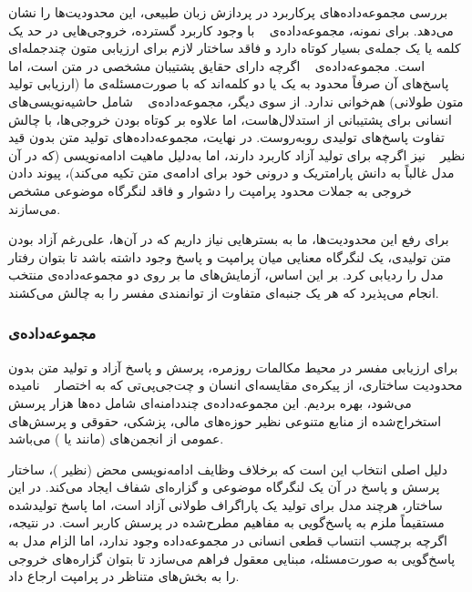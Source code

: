 بررسی مجموعه‌داده‌های پرکاربرد در پردازش زبان طبیعی، این محدودیت‌ها را نشان می‌دهد. برای نمونه، مجموعه‌داده‌ی \href{https://huggingface.co/datasets/stanfordnlp/coqa/}{}~\cite{reddy2019coqa} با وجود کاربرد گسترده، خروجی‌هایی در حد یک کلمه یا یک جمله‌ی بسیار کوتاه دارد و فاقد ساختار لازم برای ارزیابی متون چندجمله‌ای است. مجموعه‌داده‌ی \href{https://huggingface.co/datasets/hotpotqa/hotpot_qa}{}~\cite{yang2018hotpotqa} اگرچه دارای حقایق پشتیبان مشخصی در متن است، اما پاسخ‌های آن صرفاً محدود به یک یا دو کلمه‌اند که با صورت‌مسئله‌ی ما (ارزیابی تولید متون طولانی) هم‌خوانی ندارد. از سوی دیگر، مجموعه‌داده‌ی \href{https://huggingface.co/datasets/StonyBrookNLP/tellmewhy}{}~\cite{lal2021tellmewhy} شامل حاشیه‌نویسی‌های انسانی برای پشتیبانی از استدلال‌هاست، اما علاوه بر کوتاه بودن خروجی‌ها، با چالش تفاوت پاسخ‌های تولیدی روبه‌روست. در نهایت، مجموعه‌داده‌های تولید متن بدون قید نظیر \href{https://huggingface.co/datasets/Salesforce/wikitext}{}~\cite{merity2017pointer} نیز اگرچه برای تولید آزاد کاربرد دارند، اما به‌دلیل ماهیت ادامه‌نویسی (که در آن مدل غالباً به دانش پارامتریک و درونی خود برای ادامه‌ی متن تکیه می‌کند)، پیوند دادن خروجی به جملات محدود پرامپت را دشوار و فاقد لنگرگاه موضوعی مشخص می‌سازند.

برای رفع این محدودیت‌ها، ما به بسترهایی نیاز داریم که در آن‌ها، علی‌رغم آزاد بودن متن تولیدی، یک لنگرگاه معنایی میان پرامپت و پاسخ وجود داشته باشد تا بتوان رفتار مدل را ردیابی کرد. بر این اساس، آزمایش‌های ما بر روی دو مجموعه‌داده‌ی منتخب انجام می‌پذیرد که هر یک جنبه‌ای متفاوت از توانمندی مفسر را به چالش می‌کشند.

\subsubsection{مجموعه‌داده‌ی }\label{sec:5-1-2-1}

برای ارزیابی مفسر در محیط مکالمات روزمره، پرسش و پاسخ آزاد و تولید متن بدون محدودیت ساختاری، از پیکره‌ی مقایسه‌ای انسان و چت‌جی‌پی‌تی که به اختصار \href{https://huggingface.co/datasets/Hello-SimpleAI/HC3/}{}~\cite{guo2023closechatgpthumanexperts} نامیده می‌شود، بهره بردیم. این مجموعه‌داده‌ی چنددامنه‌ای شامل ده‌ها هزار پرسش استخراج‌شده از منابع متنوعی نظیر حوزه‌های مالی، پزشکی، حقوقی و پرسش‌های عمومی از انجمن‌های  (مانند  یا ) می‌باشد. 

دلیل اصلی انتخاب  این است که برخلاف وظایف ادامه‌نویسی محض (نظیر )، ساختار پرسش و پاسخ در آن یک لنگرگاه موضوعی و گزاره‌ای شفاف ایجاد می‌کند. در این ساختار، هرچند مدل برای تولید یک پاراگراف طولانی آزاد است، اما پاسخ تولیدشده مستقیماً ملزم به پاسخ‌گویی به مفاهیم مطرح‌شده در پرسش کاربر است. در نتیجه، اگرچه برچسب انتساب قطعی انسانی در مجموعه‌داده وجود ندارد، اما الزام مدل به پاسخ‌گویی به صورت‌مسئله، مبنایی معقول فراهم می‌سازد تا بتوان گزاره‌های خروجی را به بخش‌های متناظر در پرامپت ارجاع داد.

